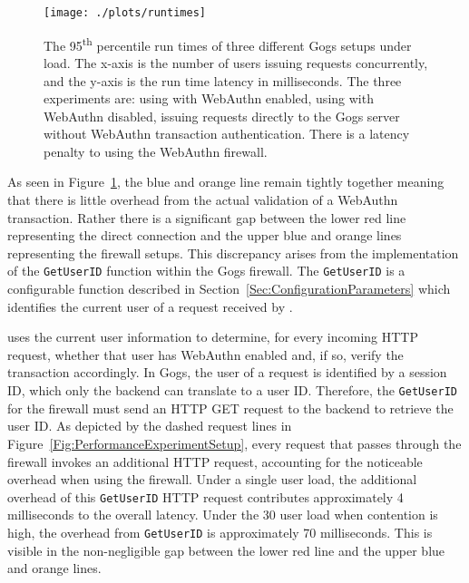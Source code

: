 \begin{figure}[h]
  \centering
  \texttt{[image: ./plots/runtimes]}
  \caption{The 95\textsuperscript{th} percentile run times of three different Gogs setups under load. The x-axis is the number of users issuing requests concurrently, and the y-axis is the run time latency in milliseconds. The three experiments are: using \sys{} with WebAuthn enabled, using \sys{} with WebAuthn disabled, issuing requests directly to the Gogs server without WebAuthn transaction authentication. There is a latency penalty to using the WebAuthn firewall.}
  \label{Fig:PerformanceOverhead}
\end{figure}

As seen in Figure~\ref{Fig:PerformanceOverhead}, the blue and orange line remain tightly together meaning that there is little overhead from the actual validation of a WebAuthn transaction. Rather there is a significant gap between the lower red line representing the direct connection and the upper blue and orange lines representing the firewall setups. This discrepancy arises from the implementation of the \lstinline{GetUserID} function within the Gogs firewall. The \lstinline{GetUserID} is a configurable function described in Section~\ref{Sec:ConfigurationParameters} which identifies the current user of a request received by \sys{}. 

\sys{} uses the current user information to determine, for every incoming HTTP request, whether that user has WebAuthn enabled and, if so, verify the transaction accordingly. In Gogs, the user of a request is identified by a session ID, which only the backend can translate to a user ID. Therefore, the \lstinline{GetUserID} for the firewall must send an HTTP GET request to the backend to retrieve the user ID. As depicted by the dashed request lines in Figure~\ref{Fig:PerformanceExperimentSetup}, every request that passes through the firewall invokes an additional HTTP request, accounting for the noticeable overhead when using the firewall. Under a single user load, the additional overhead of this \lstinline{GetUserID} HTTP request contributes approximately 4 milliseconds to the overall latency. Under the 30 user load when contention is high, the overhead from \lstinline{GetUserID} is approximately 70 milliseconds. This is visible in the non-negligible gap between the lower red line and the upper blue and orange lines.


